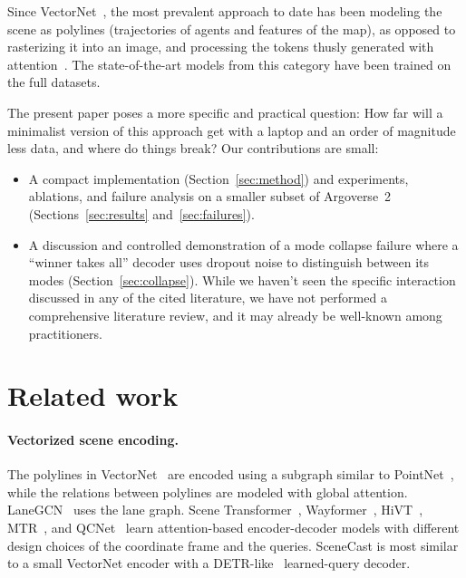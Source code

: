 \documentclass[10pt]{article}
\begin{document}
Since VectorNet~\cite{gao2020vectornet}, the most prevalent approach to date has been
modeling the scene as polylines (trajectories of agents and features of the map), as opposed
to rasterizing it into an image, and processing the tokens thusly generated with
attention~\cite{vaswani2017attention,liang2020lanegcn,ngiam2022scenetransformer,
nayakanti2023wayformer,zhou2022hivt,shi2022mtr,zhou2023qcnet}. The state-of-the-art models
from this category have been trained on the full datasets.

The present paper poses a more specific and practical question: How far will a minimalist
version of this approach get with a laptop and an order of magnitude less data, and where do
things break? Our contributions are small:
\begin{itemize}
  \item A compact implementation (Section~\ref{sec:method}) and experiments, ablations, and
        failure analysis on a smaller subset of Argoverse~2
        (Sections~\ref{sec:results} and~\ref{sec:failures}).
  \item A discussion and controlled demonstration of a mode collapse failure where a
        ``winner takes all'' decoder uses dropout noise to distinguish between its modes
        (Section~\ref{sec:collapse}). While we haven't seen the specific interaction
        discussed in any of the cited literature, we have not performed a comprehensive
        literature review, and it may already be well-known among practitioners.
\end{itemize}

\section{Related work}

\paragraph{Vectorized scene encoding.} The polylines in VectorNet~\cite{gao2020vectornet} are
encoded using a subgraph similar to PointNet~\cite{qi2017pointnet}, while the relations
between polylines are modeled with global attention. LaneGCN~\cite{liang2020lanegcn} uses the
lane graph. Scene Transformer~\cite{ngiam2022scenetransformer},
Wayformer~\cite{nayakanti2023wayformer}, HiVT~\cite{zhou2022hivt}, MTR~\cite{shi2022mtr}, and
QCNet~\cite{zhou2023qcnet} learn attention-based encoder-decoder models with different design
choices of the coordinate frame and the queries. SceneCast is most similar to a small
VectorNet encoder with a DETR-like~\cite{carion2020detr} learned-query decoder.
\end{document}
